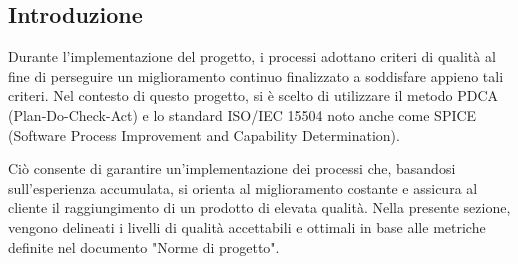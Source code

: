 \subsection{Introduzione}
Durante l'implementazione del progetto, i processi adottano criteri di qualità al fine di perseguire un miglioramento continuo finalizzato a soddisfare appieno tali criteri.
Nel contesto di questo progetto, si è scelto di utilizzare il metodo PDCA (Plan-Do-Check-Act) e lo standard ISO/IEC 15504 noto anche come SPICE (Software Process Improvement and Capability Determination).

Ciò consente di garantire un'implementazione dei processi che, basandosi sull'esperienza accumulata, si orienta al miglioramento costante e assicura al cliente il raggiungimento di un prodotto di elevata qualità. Nella presente sezione, vengono delineati i livelli di qualità accettabili e ottimali in base alle metriche definite nel documento "Norme di progetto".
